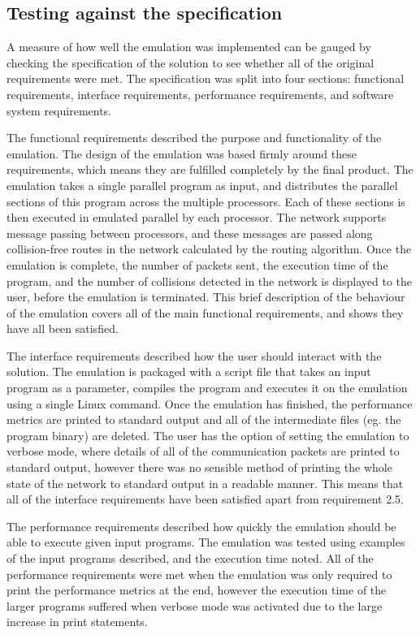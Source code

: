 \documentclass[a4paper, 12pt]{article}
\begin{document}
\subsection{Testing against the specification}

A measure of how well the emulation was implemented can be gauged by checking the specification of the solution to see whether all of the original requirements were met. The specification was split into four sections: functional requirements, interface requirements, performance requirements, and software system requirements.

The functional requirements described the purpose and functionality of the emulation. The design of the emulation was based firmly around these requirements, which means they are fulfilled completely by the final product. The emulation takes a single parallel program as input, and distributes the parallel sections of this program across the multiple processors. Each of these sections is then executed in emulated parallel by each processor. The network supports message passing between processors, and these messages are passed along collision-free routes in the network calculated by the routing algorithm. Once the emulation is complete, the number of packets sent, the execution time of the program, and the number of collisions detected in the network is displayed to the user, before the emulation is terminated. This brief description of the behaviour of the emulation covers all of the main functional requirements, and shows they have all been satisfied.

The interface requirements described how the user should interact with the solution. The emulation is packaged with a script file that takes an input program as a parameter, compiles the program and executes it on the emulation using a single Linux command. Once the emulation has finished, the performance metrics are printed to standard output and all of the intermediate files (eg. the program binary) are deleted. The user has the option of setting the emulation to verbose mode, where details of all of the communication packets are printed to standard output, however there was no sensible method of printing the whole state of the network to standard output in a readable manner. This means that all of the interface requirements have been satisfied apart from requirement 2.5.

The performance requirements described how quickly the emulation should be able to execute given input programs. The emulation was tested using examples of the input programs described, and the execution time noted. All of the performance requirements were met when the emulation was only required to print the performance metrics at the end, however the execution time of the larger programs suffered when verbose mode was activated due to the large increase in print statements.
\end{document}

